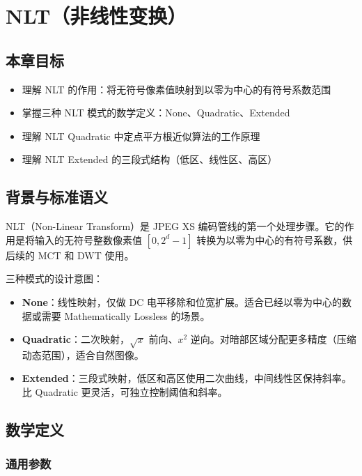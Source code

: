 
\chapter{NLT（非线性变换）}\label{ch:nlt}

\section{本章目标}

\begin{itemize}
  \item 理解 NLT 的作用：将无符号像素值映射到以零为中心的有符号系数范围
  \item 掌握三种 NLT 模式的数学定义：None、Quadratic、Extended
  \item 理解 NLT Quadratic 中定点平方根近似算法的工作原理
  \item 理解 NLT Extended 的三段式结构（低区、线性区、高区）
\end{itemize}

\section{背景与标准语义}

NLT（Non-Linear Transform）是 JPEG XS 编码管线的第一个处理步骤。它的作用是将输入的无符号整数像素值 $[0, 2^d - 1]$ 转换为以零为中心的有符号系数，供后续的 MCT 和 DWT 使用。

三种模式的设计意图：

\begin{itemize}
  \item \textbf{None}：线性映射，仅做 DC 电平移除和位宽扩展。适合已经以零为中心的数据或需要 Mathematically Lossless 的场景。
  \item \textbf{Quadratic}：二次映射，$\sqrt{x}$ 前向、$x^2$ 逆向。对暗部区域分配更多精度（压缩动态范围），适合自然图像。
  \item \textbf{Extended}：三段式映射，低区和高区使用二次曲线，中间线性区保持斜率。比 Quadratic 更灵活，可独立控制阈值和斜率。
\end{itemize}

\section{数学定义}

\subsection{通用参数}

